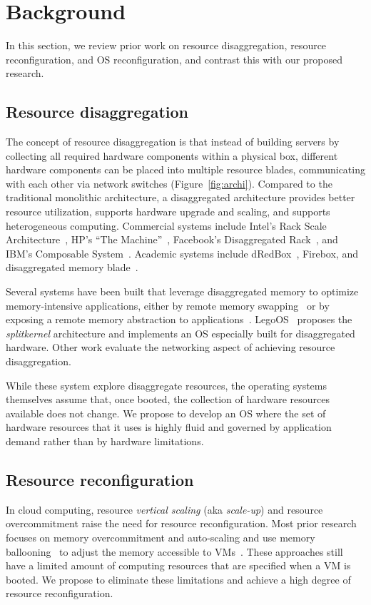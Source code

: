 \section{Background}
\label{sec:background}
In this section, we review prior work on resource disaggregation,
resource reconfiguration, and OS reconfiguration, and contrast
this with our proposed research.

\subsection{Resource disaggregation}
The concept of resource disaggregation is that instead of building
servers by collecting all required hardware components within a
physical box, different hardware components can be placed into
multiple resource blades, communicating with each other via network
switches (Figure~\ref{fig:archi}). Compared to the traditional
monolithic architecture, a disaggregated architecture provides
better resource utilization, supports hardware upgrade and scaling,
and supports heterogeneous computing.  Commercial systems include
Intel’s Rack Scale Architecture~\cite{Intel_RSA}, HP’s “The
Machine”~\cite{HP_The_Machine}, Facebook’s Disaggregated
Rack~\cite{FB_disaggregated_rack}, and IBM’s Composable
System~\cite{chung2018towards}.  Academic systems include
dRedBox~\cite{katrinis2016rack}, Firebox\cite{asanovic2014firebox},
and disaggregated memory blade~\cite{lim2009disaggregated}.

Several systems have been built that leverage disaggregated memory
to optimize memory-intensive applications, either by remote memory
swapping~\cite{lagar2019software, al2020effectively, gu2017efficient}
or by exposing a remote memory abstraction to
applications~\cite{aguilera2018remote}.  LegoOS~\cite{shan2018legoos}
proposes the \emph{splitkernel} architecture and implements an OS
especially built for disaggregated hardware. Other work
evaluate the networking aspect of achieving resource
disaggregation\cite{abali2015disaggregated, gao2016network}.

While these system explore disaggregate resources, the
operating systems themselves assume that, once booted, the
collection of hardware resources available does not change.
We propose to develop an OS where the set of hardware resources
that it uses is highly fluid and governed by application demand
rather than by hardware limitations.

\subsection{Resource reconfiguration}
In cloud computing, resource \emph{vertical scaling} (aka
\emph{scale-up}) and resource overcommitment raise the need for
resource reconfiguration.  Most prior research focuses on memory
overcommitment and auto-scaling and use memory
ballooning~\cite{waldspurger02} to adjust the memory accessible to
VMs~\cite{salomie2013application, amit2014vswapper, hines2011applications,
agmon2014ginseng, shaikh2015dynamic, molto2013elastic}. These
approaches still have a limited amount of computing resources that
are specified when a VM is booted. We propose to eliminate these
limitations and achieve a high degree of resource reconfiguration.

